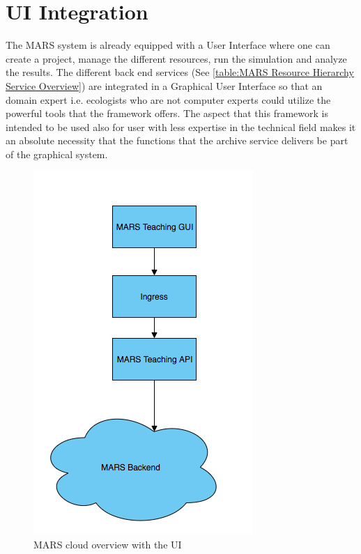 \section{UI Integration}
The MARS system is already equipped with a User Interface where one can create a project, manage the different resources, run the simulation and
analyze the results. The different back end services (See \ref{table:MARS Resource Hierarchy Service Overview}) are integrated in a Graphical
User Interface so that an domain expert i.e. ecologists who are not computer experts could utilize the powerful tools that the framework offers.
The aspect that this framework is intended to be used also for user with less expertise in the technical field makes it an absolute necessity that
the functions that the archive service delivers be part of the graphical system.

\begin{figure}[H]
    \centering \includegraphics[scale=0.6]{grafiken/marsIngress.png}
    \caption{MARS cloud overview with the UI}
    \label{fig:marsCloudUI}
\end{figure}

